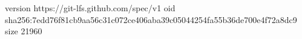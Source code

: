 version https://git-lfs.github.com/spec/v1
oid sha256:7edd76f81cb9aa56c31c072ce406aba39c05044254fa55b36de700e4f72a8dc9
size 21960
